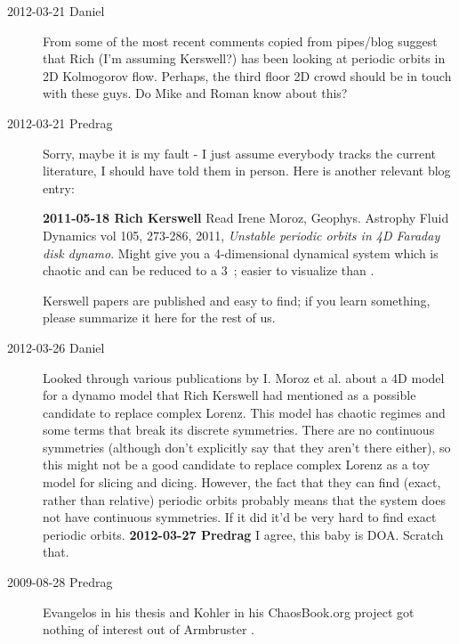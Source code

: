 \begin{description}
\item[2012-03-21 Daniel]
From some of the most recent comments copied from pipes/blog suggest that
Rich (I'm assuming Kerswell?) has been looking at periodic orbits in 2D
Kolmogorov flow. Perhaps, the third floor 2D crowd should be in touch
with these guys. Do Mike and Roman know about this?

\item[2012-03-21 Predrag]
Sorry, maybe it is my fault - I just assume everybody tracks the current
literature, I should have told them in person. Here is another relevant
blog entry:

{\bf 2011-05-18  Rich Kerswell} Read Irene Moroz, Geophys. Astrophy Fluid
Dynamics vol 105, 273-286, 2011, \emph{Unstable periodic orbits in 4D
Faraday disk dynamo}. Might give you a 4-dimensional dynamical system
which is chaotic and can be reduced to a 3\dmn\ \statesp; easier to
visualize than {\cLf}.

Kerswell papers are published and easy to find; if you learn something,
please summarize it here for the rest of us.

\item[2012-03-26 Daniel] Looked through various publications by I. Moroz
et al. about a 4D model for a dynamo model that Rich Kerswell had
mentioned as a possible candidate to replace complex Lorenz. This model
has chaotic regimes and some terms that break its discrete symmetries.
There are no continuous symmetries (although don't explicitly say that
they aren't there either), so this might not be a good candidate to
replace complex Lorenz as a toy model for slicing and dicing. However,
the fact that they can find (exact, rather than relative) periodic orbits
probably means that the system does not have continuous symmetries. If it
did it'd be very hard to find exact periodic orbits.
{\bf 2012-03-27 Predrag} I agree, this baby is DOA. Scratch that.


\item[2009-08-28 Predrag] Evangelos in his thesis and Kohler in his
 {ChaosBook.org project} got nothing
of interest out of Armbruster \etal{}.


\end{description}
